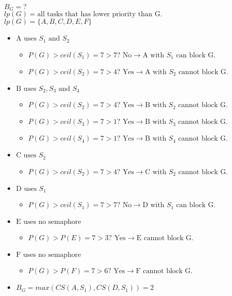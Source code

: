     $B_G = ?$\\
    $lp(G) = \text{all tasks that has lower priority than G.}$\\
    $lp(G) = \{A, B, C, D, E, F\}$
    \begin{itemize}
        \item $\text{A uses } S_1 \text{ and } S_2$
        \begin{itemize}
            \item $P(G)>ceil(S_1) = 7>7? \text{ No} \rightarrow \text{A with } S_1 \text{ can block G.}$
            \item $P(G)>ceil(S_2) = 7>4? \text{ Yes} \rightarrow \text{A with } S_2 \text{ cannot block G.}$
        \end{itemize}
        \item $\text{B uses } S_2, S_3 \text{ and } S_4$
        \begin{itemize}
            \item $P(G)>ceil(S_2) = 7>4? \text{ Yes} \rightarrow \text{B with } S_2 \text{ cannot block G.}$
            \item $P(G)>ceil(S_3) = 7>1? \text{ Yes} \rightarrow \text{B with } S_3 \text{ cannot block G.}$
            \item $P(G)>ceil(S_4) = 7>1? \text{ Yes} \rightarrow \text{B with } S_4 \text{ cannot block G.}$
        \end{itemize}
        \item $\text{C uses } S_2$
        \begin{itemize}
            \item $P(G)>ceil(S_2) = 7>4? \text{ Yes} \rightarrow \text{C with } S_2 \text{ cannot block G.}$
        \end{itemize}
        \item $\text{D uses } S_1$
        \begin{itemize}
            \item $P(G)>ceil(S_1) = 7>7? \text{ No} \rightarrow \text{D with } S_1 \text{ can block G.}$
        \end{itemize}
        \item $\text{E uses no semaphore}$
        \begin{itemize}
            \item $P(G)>P(E) = 7>3? \text{ Yes} \rightarrow \text{E cannot block G.}$
        \end{itemize}
        \item $\text{F uses no semaphore}$
        \begin{itemize}
            \item $P(G)>P(F) = 7>6? \text{ Yes} \rightarrow \text{F cannot block G.}$
        \end{itemize}
        \item $B_G = max(CS(A,S_1), CS(D,S_1)) = 2$\\
    \end{itemize}

